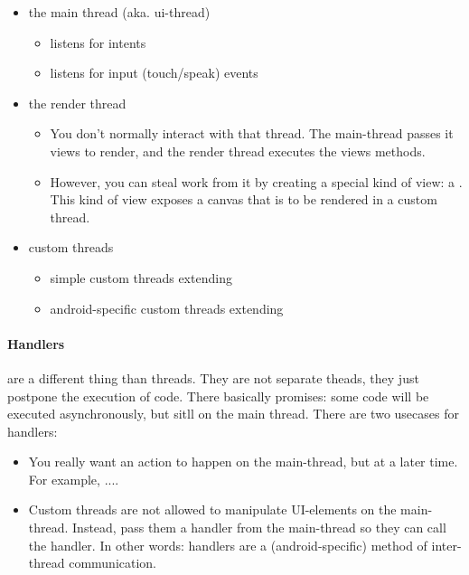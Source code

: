 \begin{itemize}
    \item the main thread (aka. ui-thread)
        \begin{itemize}
            \item listens for intents
            \item listens for input (touch/speak) events
        \end{itemize}
    
    \item the render thread
        \begin{itemize}
            \item You don't normally interact with that thread. The main-thread passes it views to render, and the render thread executes the views  methods. 
            \item However, you can steal work from it by creating a special kind of view: a . This kind of view exposes a canvas that is to be rendered in a custom thread.  
        \end{itemize}
        
    \item custom threads
        \begin{itemize}
            \item simple custom threads extending 
            \item android-specific custom threads extending 
        \end{itemize}
\end{itemize}

\paragraph{Handlers} are a different thing than threads. They are not separate theads, they just postpone the execution of code. There basically promises: some code will be executed asynchronously, but sitll on the main thread. There are two usecases for handlers: 

\begin{itemize}
    \item You really want an action to happen on the main-thread, but at a later time. For example, ....
    \item Custom threads are not allowed to manipulate UI-elements on the main-thread. Instead, pass them a handler from the main-thread so they can call the handler. In other words: handlers are a (android-specific) method of inter-thread communication. 
\end{itemize}


